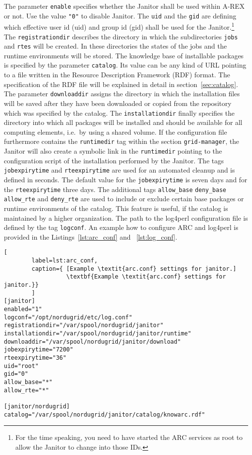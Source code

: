 The parameter \texttt{enable} specifies whether the Janitor shall be used
within A-REX or not. Use the value \texttt{"0"} to disable Janitor. The
\texttt{uid} and the \texttt{gid} are defining which effective user id
(uid) and group id (gid) shall be used for the Janitor.\footnote{For
the time speaking, you need to have started the ARC services as root to
allow the Janitor to change into those IDs.} The \texttt{registrationdir}
describes the directory in which the subdirectories \texttt{jobs} and
\texttt{rtes} will be created.  In these directories the states of the
jobs and the runtime environments will be stored.  The knowledge base
of installable packages is specified by the parameter \texttt{catalog}.
Its value can be any kind of URL pointing to a file written in the
Resource Description Framework (RDF) format.  The specification of the
RDF file will be explained in detail in section~\ref{sec:catalog}.
The parameter \texttt{downloaddir} assigns the directory in which
the installation files will be saved after they have been downloaded
or copied from the repository which was specified by the catalog. The
\texttt{installationdir} finally specifies the directory into which all
packages will be installed and should be available for all computing
elements, i.e.\ by using a shared volume.  If the configuration file
furthermore contains the \texttt{runtimedir} tag within the section
\texttt{grid-manager}, the Janitor will also create a symbolic link
in the \texttt{runtimedir} pointing to the configuration script of the
installation performed by the Janitor.  The tags \texttt{jobexpirytime}
and \texttt{rteexpirytime} are used for an automated cleanup and is
defined in seconds.  The default value for the \texttt{jobexpirytime} is
seven days and for the \texttt{rteexpirytime} three days.  The additional
tags \texttt{allow\_base} \texttt{deny\_base} \texttt{allow\_rte} and
\texttt{deny\_rte} are used to include or exclude certain base packages
or runtime environments of the catalog. This feature is useful, if
the catalog is maintained by a higher organization.  The path to the
log4perl configuration file is defined by the tag \texttt{logconf}.
An example how to configure ARC and log4perl is provided in the
Listings~\ref{lst:arc_conf} and ~\ref{lst:log_conf}.

\begin{lstlisting}[
        label=lst:arc_conf,
        caption={ [Example \textit{arc.conf} settings for janitor.]
                  \textbf{Example \textit{arc.conf} settings for janitor.}}
        ]
[janitor]
enabled="1"
logconf="/opt/nordugrid/etc/log.conf"
registrationdir="/var/spool/nordugrid/janitor"
installationdir="/var/spool/nordugrid/janitor/runtime"
downloaddir="/var/spool/nordugrid/janitor/download"
jobexpirytime="7200"
rteexpirytime="36"
uid="root"
gid="0"
allow_base="*"
allow_rte="*"

[janitor/nordugrid]
catalog="/var/spool/nordugrid/janitor/catalog/knowarc.rdf"
\end{lstlisting}

